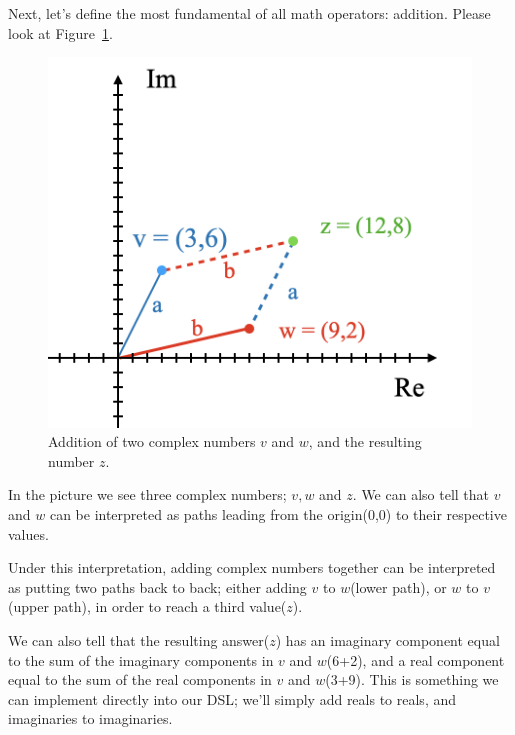 
Next, let's define the most fundamental of all math operators: addition. Please look at Figure~\ref{addition}.

\begin{figure}[h!]
    \centering
    \includegraphics[scale= 0.4]{Addition.png}
    \caption{Addition of two complex numbers $v$ and $w$, and the resulting number $z$.}
    \label{addition}
\end{figure}

In the picture we see three complex numbers; $v, w$ and $z$. We can also tell that $v$ and $w$ can be interpreted as paths leading from the origin(0,0) to their respective values.

Under this interpretation, adding complex numbers together can be interpreted as putting two paths back to back; either adding $v$ to $w$(lower path), or $w$ to $v$(upper path), in order to reach a third value($z$).

We can also tell that the resulting answer($z$) has an imaginary component equal to the sum of the imaginary components in $v$ and $w$(6+2), and a real component equal to the sum of the real components in $v$ and $w$(3+9). This is something we can implement directly into our DSL; we'll simply add reals to reals, and imaginaries to imaginaries.


